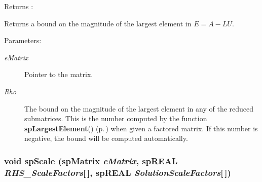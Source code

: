 \begin{Desc}
\item[Returns :]\par
 Returns a bound on the magnitude of the largest element in $ E = A - LU $.\end{Desc}
\begin{Desc}
\item[Parameters: ]\par
\begin{description}
\item[{\em 
e\-Matrix}]Pointer to the matrix. \item[{\em 
Rho}]The bound on the magnitude of the largest element in any of the reduced submatrices. This is the number computed by the function {\bf sp\-Largest\-Element}() {\rm (p.\,\pageref{spUtils_8c_a22})} when given a factored matrix. If this number is negative, the bound will be computed automatically. \end{description}
\end{Desc}
\subsubsection{\setlength{\rightskip}{0pt plus 5cm}void sp\-Scale ({\bf sp\-Matrix} {\em e\-Matrix}, sp\-REAL {\em RHS\_\-Scale\-Factors}[$\,$], sp\-REAL {\em Solution\-Scale\-Factors}[$\,$])}\label{spUtils_8c_a12}


